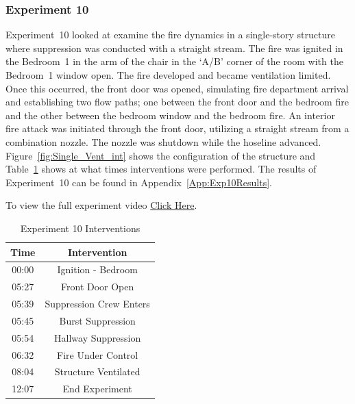 \documentclass[12pt,oneside]{book}
\begin{document}
\subsubsection{Experiment 10}
Experiment~10 looked at examine the fire dynamics in a single-story structure where suppression was conducted with a straight stream. The fire was ignited in the Bedroom~1 in the arm of the chair in the `A/B' corner of the room with the Bedroom~1 window open. The fire developed and became ventilation limited. Once this occurred, the front door was opened, simulating fire department arrival and establishing two flow paths; one between the front door and the bedroom fire and the other between the bedroom window and the bedroom fire. An interior fire attack was initiated through the front door, utilizing a straight stream from a combination nozzle. The nozzle was shutdown while the hoseline advanced. Figure~\ref{fig:Single_Vent_int} shows the configuration of the structure and Table~\ref{Table:Exp10Interventions} shows at what times interventions were performed. The results of Experiment~10 can be found in Appendix~\ref{App:Exp10Results}. 

To view the full experiment video \href{https://player.vimeo.com/video/170510939?autoplay=1}{Click Here}.

\begin{table}[H]
	\centering
	\caption{Experiment 10 Interventions}
	\begin{tabular}{|c|c|} 
		\hline
		Time & Intervention \\ \hline \hline
		00:00 & Ignition - Bedroom \\ \hline
		05:27 & Front Door Open \\ \hline
		05:39 & Suppression Crew Enters\\ \hline
		05:45 & Burst Suppression \\ \hline 
		05:54 & Hallway Suppression \\ \hline
		06:32 & Fire Under Control 	\\ \hline
		08:04 & Structure Ventilated \\ \hline
		12:07 & End Experiment\\ \hline
	\end{tabular}
	\label{Table:Exp10Interventions}
\end{table}

\FloatBarrier
\clearpage
\end{document}
